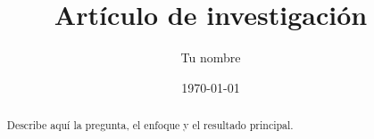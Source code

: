 \documentclass[11pt]{article}
\title{ Artículo de investigación }
\author{ Tu nombre }
\date{\today}
\begin{document}
\maketitle
\begin{abstract}
Describe aquí la pregunta, el enfoque y el resultado principal.
\end{abstract}


\printbibliography
\end{document}
